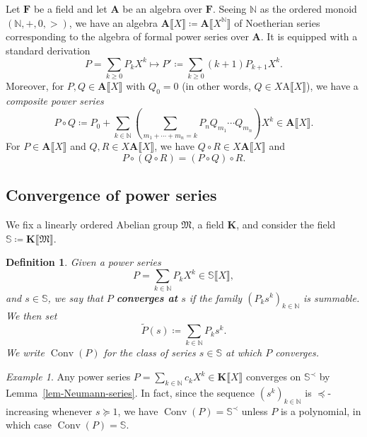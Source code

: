 \documentclass{article}
\newcommand{\Alpha}{\mathrm{A}}
\newcommand{\assign}{\coloneqq}
\newcommand{\tmem}[1]{{\em #1\/}}
\newcommand{\tmmathbf}[1]{\ensuremath{\boldsymbol{#1}}}
\newcommand{\tmop}[1]{\ensuremath{\operatorname{#1}}}
\newcommand{\tmstrong}[1]{\textbf{#1}}
\newtheorem{definition}[theorem]{Definition}
\theoremstyle{remark}\newtheorem*{convention*}{Convention}
\newtheorem{example}[theorem]{Example}
\begin{document}
Let $\mathbf{F}$ be a field and let $\mathbf{A}$ be an algebra over
$\mathbf{F}$. Seeing $\mathbb{N}$ as the ordered monoid $(\mathbb{N}, +, 0,
>)$, we have an algebra $\mathbf{A} \llbracket X \rrbracket \assign \mathbf{A}
\llbracket X^{\mathbb{N}} \rrbracket$ of Noetherian series corresponding to
the algebra of formal power series over $\mathbf{A}$. It is equipped with a
standard derivation
\[ P = \sum_{k \geqslant 0} P_k X^k \longmapsto P' \assign \sum_{k \geqslant
   0} (k + 1) P_{k + 1} X^k . \]
Moreover, for $P, Q \in \mathbf{A} \llbracket X \rrbracket$ with $Q_0 = 0$ (in
other words, $Q \in X\tmmathbf{\Alpha} \llbracket X \rrbracket$), we have a
{\tmem{composite power series}}{}
\[ P \circ Q \assign P_0 + \sum_{k \in \mathbb{N}} \left( \sum_{m_1 + \cdots +
   m_n = k} P_n Q_{m_1} \cdots Q_{m_n} \right) X^k \in \mathbf{A} \llbracket X
   \rrbracket . \]
For $P \in \mathbf{A} \llbracket X \rrbracket$ and $Q, R \in X \mathbf{A}
\llbracket X \rrbracket$, we have $Q \circ R \in X \mathbf{A} \llbracket X
\rrbracket$ and
\[ P \circ (Q \circ R) = (P \circ Q) \circ R. \]

\subsection{Convergence of power series}

We fix a linearly ordered Abelian group $\mathfrak{M}$, a field $\mathbf{K}$,
and consider the field $\mathbb{S} \assign \mathbf{K} \llbracket \mathfrak{M}
\rrbracket$.

\begin{definition}
  Given a power series
  \[ P = \sum_{k \in \mathbb{N}} P_k X^k \in \mathbb{S} \llbracket X
     \rrbracket, \]
  and $s \in \mathbb{S}$, we say that $P$ {\tmstrong{{\tmem{converges at}}}}
  $s${} if the family $(P_k s^k)_{k \in
  \mathbb{N}}$ is summable. We then set\label{autolab16}
  \[ \tilde{P} (s) \assign \sum_{k \in \mathbb{N}} P_k s^k . \]
  We write $\tmop{Conv} (P)$\label{autolab17} for the class of series $s \in
  \mathbb{S}$ at which $P$ converges. 
\end{definition}

\begin{example}
  Any power series $P = \sum_{k \in \mathbb{N}} c_k X^k \in \mathbf{K}
  \llbracket X \rrbracket$ converges on $\mathbb{S}^{\prec}$ by
  Lemma~\ref{lem-Neumann-series}. In fact, since the sequence $(s^k)_{k \in
  \mathbb{N}}$ is $\preccurlyeq$-increasing whenever $s \succcurlyeq 1$, we
  have $\tmop{Conv} (P) =\mathbb{S}^{\prec}$ unless $P$ is a polynomial, in
  which case $\tmop{Conv} (P) =\mathbb{S}$.
\end{example}
\end{document}
